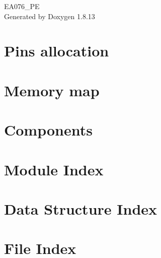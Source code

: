 \documentclass[twoside]{book}
\newcommand{\+}{\discretionary{\mbox{\scriptsize$\hookleftarrow$}}{}{}}
\newcommand{\clearemptydoublepage}{%
  \newpage{\pagestyle{empty}\cleardoublepage}%
}
\begin{document}
\hypersetup{pageanchor=false,
             bookmarksnumbered=true,
             pdfencoding=unicode
            }
\begin{titlepage}
\vspace*{7cm}
\begin{center}%
{\Large E\+A076\+\_\+\+PE }\\
\vspace*{1cm}
{\large Generated by Doxygen 1.8.13}\\
\end{center}
\end{titlepage}
\clearemptydoublepage
{}
\tableofcontents
\clearemptydoublepage
{}
\hypersetup{pageanchor=true}

\chapter{Pins allocation}
\label{page_pinalloc}

\chapter{Memory map}
\label{page_memorymap}

\chapter{Components}
\label{page_components}

\chapter{Module Index}

\chapter{Data Structure Index}

\chapter{File Index}

\end{document}
